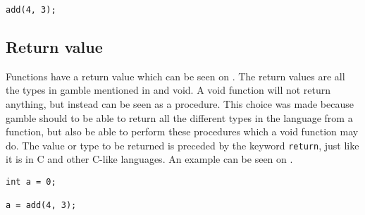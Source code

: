 \begin{lstlisting}[caption={A function call in \gls{gamble}},label={lst:functionCall},numbers=none]
add(4, 3);
\end{lstlisting}


\subsection*{Return value}
Functions have a return value which can be seen on .
The return values are all the types in \gls{gamble} mentioned in  and void. 
A void function will not return anything, but instead can be seen as a procedure.
This choice was made because \gls{gamble} should to be able to return all the different types in the language from a function, but also be able to perform these procedures which a void function may do.
The value or type to be returned is preceded by the keyword \texttt{return}, just like it is in C and other C-like languages.
An example can be seen on .

\begin{lstlisting}[caption={Return Function},label={lst:returnFunction}]
int a = 0;

a = add(4, 3);
\end{lstlisting}


%


